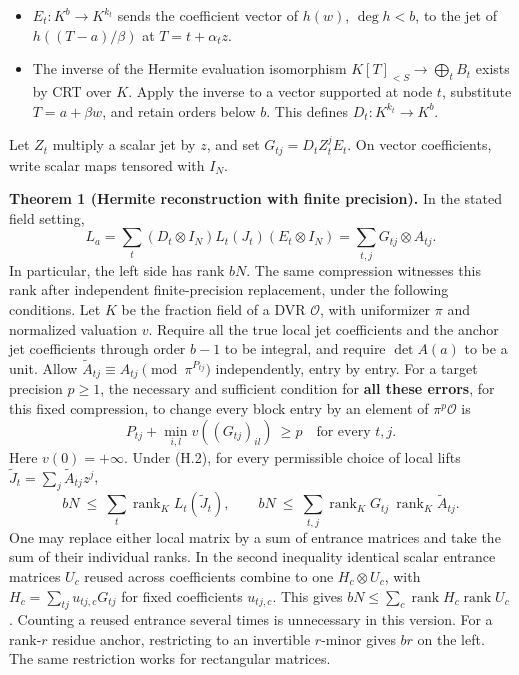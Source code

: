 \documentclass[
  11pt,
]{article}
\providecommand{\tightlist}{%
  \setlength{\itemsep}{0pt}\setlength{\parskip}{0pt}}
\begin{document}
\begin{itemize}
\tightlist
\item
  \(E_t:K^b\longrightarrow K^{k_t}\) sends the coefficient vector of
  \(h(w)\), \(\deg h<b\), to the jet of \(h((T-a)/\beta)\) at
  \(T=t+\alpha_tz\).
\item
  The inverse of the Hermite evaluation isomorphism
  \(K[T]_{<S}\longrightarrow\bigoplus_t B_t\) exists by CRT over \(K\).
  Apply the inverse to a vector supported at node \(t\), substitute
  \(T=a+\beta w\), and retain orders below \(b\). This defines
  \(D_t:K^{k_t}\longrightarrow K^b\).
\end{itemize}

Let \(Z_t\) multiply a scalar jet by \(z\), and set
\(G_{tj}=D_tZ_t^jE_t\). On vector coefficients, write scalar maps
tensored with \(I_N\).

\textbf{Theorem 1 (Hermite reconstruction with finite precision).} In
the stated field setting, \[
 L_a=\sum_t (D_t\otimes I_N)L_t(J_t)(E_t\otimes I_N)
     =\sum_{t,j} G_{tj}\otimes A_{tj} . \tag{H.1}
\] In particular, the left side has rank \(bN\). The same compression
witnesses this rank after independent finite-precision replacement,
under the following conditions. Let \(K\) be the fraction field of a DVR
\(\mathcal O\), with uniformizer \(\pi\) and normalized valuation \(v\).
Require all the true local jet coefficients and the anchor jet
coefficients through order \(b-1\) to be integral, and require
\(\det A(a)\) to be a unit. Allow
\(\widetilde A_{tj}\equiv A_{tj}\pmod{\pi^{P_{tj}}}\) independently,
entry by entry. For a target precision \(p\ge1\), the necessary and
sufficient condition for \textbf{all these errors}, for this fixed
compression, to change every block entry by an element of
\(\pi^p\mathcal O\) is \[
       P_{tj}+\min_{i,l} v((G_{tj})_{il})\ \ge p\quad\text{for every }t,j. \tag{H.2}
\] Here \(v(0)=+\infty\). Under (H.2), for every permissible choice of
local lifts \(\widetilde J_t=\sum_j\widetilde A_{tj}z^j\), \[
 bN\ \le\ \sum_t\operatorname{rank}_K L_t(\widetilde J_t),\qquad
 bN\ \le\ \sum_{t,j}\operatorname{rank}_K G_{tj}\ \operatorname{rank}_K\widetilde A_{tj}. \tag{H.3}
\] One may replace either local matrix by a sum of entrance matrices and
take the sum of their individual ranks. In the second inequality
identical scalar entrance matrices \(U_c\) reused across coefficients
combine to one \(H_c\otimes U_c\), with \(H_c=\sum_{tj}u_{tj,c}G_{tj}\)
for fixed coefficients \(u_{tj,c}\). This gives
\(bN\le\sum_c\operatorname{rank}H_c\operatorname{rank}U_c\). Counting a
reused entrance several times is unnecessary in this version. For a
rank-\(r\) residue anchor, restricting to an invertible \(r\)-minor
gives \(br\) on the left. The same restriction works for rectangular
matrices.
\end{document}

